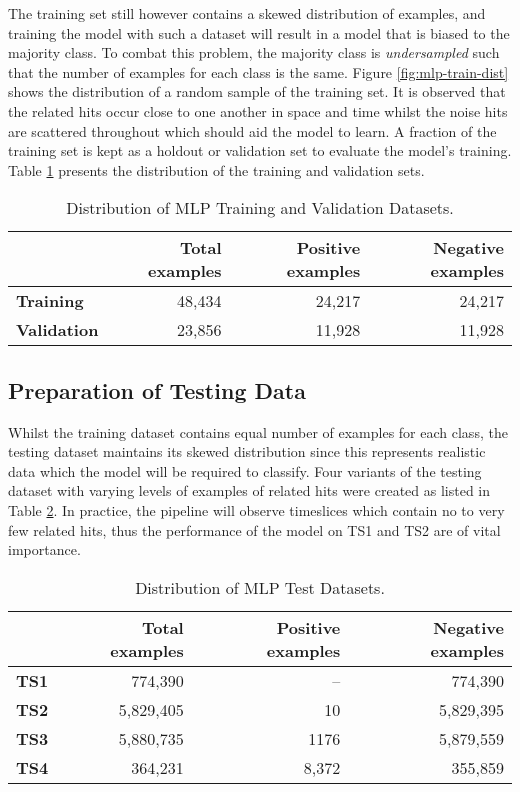The training set still however contains a skewed distribution of
examples, and training the model with such a dataset will result in a
model that is biased to the majority class. To combat this problem,
the majority class is \emph{undersampled} such that the number of
examples for each class is the same. Figure \ref{fig:mlp-train-dist}
shows the distribution of a random sample of the training set. It is
observed that the related hits occur close to one another in space and
time whilst the noise hits are scattered throughout which should aid
the model to learn. A fraction of the training set is kept as a
holdout or validation set to evaluate the model's training. Table
\ref{tab:mlp-train-dist} presents the distribution of the training and
validation sets.

\begin{table}[htb]
  \centering
  \caption{Distribution of MLP Training and Validation Datasets.}
  \begin{tabular}{lrrr}
    \hline
    & Total examples & Positive examples & Negative examples \\
    \hline
    \textbf{Training} & 48,434 & 24,217 & 24,217 \\
    \textbf{Validation} & 23,856 & 11,928 & 11,928 \\
    \hline
  \end{tabular}
  \label{tab:mlp-train-dist}  
\end{table}

\subsection{Preparation of Testing Data}
\label{sec:mlp-data-prep-test}

Whilst the training dataset contains equal number of examples for each
class, the testing dataset maintains its skewed distribution since
this represents realistic data which the model will be required to
classify. Four variants of the testing dataset with varying levels of
examples of related hits were created as listed in Table
\ref{tab:mlp-test-dist}. In practice, the pipeline will observe
timeslices which contain no to very few related hits, thus the
performance of the model on TS1 and TS2 are of vital importance.

\begin{table}[htb]
  \centering
  \caption{Distribution of MLP Test Datasets.}
  \begin{tabular}{lrrr}
    \hline
    & Total examples & Positive examples & Negative examples \\
    \hline
    \textbf{TS1} & 774,390 & -- & 774,390 \\
    \textbf{TS2} & 5,829,405 & 10 & 5,829,395 \\
    \textbf{TS3} & 5,880,735 & 1176 & 5,879,559 \\
    \textbf{TS4} & 364,231 & 8,372 & 355,859 \\
    \hline
  \end{tabular}
  \label{tab:mlp-test-dist}
\end{table}

